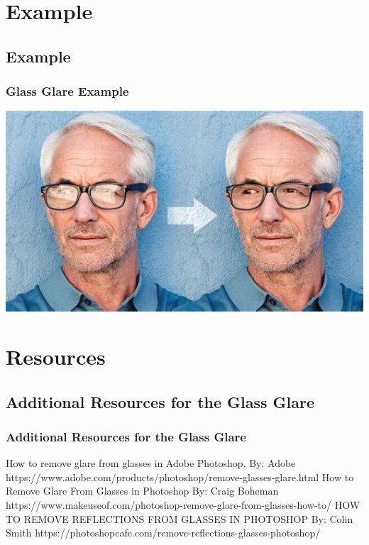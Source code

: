 \documentclass{beamer}
\begin{document}
\section{Example}

\subsection{Example}		
	\begin{frame}
		\frametitle{Glass Glare Example}
		\begin{center}
			\includegraphics[width=1.0\textwidth]{images/remove glass glare.jpg}
		\end{center}
	\end{frame}

\section{Resources}
\subsection{Additional Resources for the Glass Glare}		
	\begin{frame}
		\frametitle{Additional Resources for the Glass Glare}
		\begin{outline}
			\1 How to remove glare from glasses in Adobe Photoshop.
			\2  By:  Adobe
			\2 https://www.adobe.com/products/photoshop/remove-glasses-glare.html
			\1 How to Remove Glare From Glasses in Photoshop
			\2  By:  Craig Boheman
			\2 https://www.makeuseof.com/photoshop-remove-glare-from-glasses-how-to/
			\1 HOW TO REMOVE REFLECTIONS FROM GLASSES IN PHOTOSHOP
			\2  By:  Colin Smith
			\2 	https://photoshopcafe.com/remove-reflections-glasses-photoshop/
		\end{outline}
	\end{frame}

	
\end{document}

